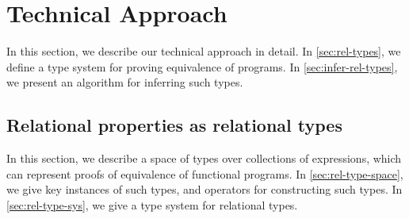 \section{Technical Approach}
%
In this section, we describe our technical approach in detail.
%
In \autoref{sec:rel-types}, we define a type system for proving
equivalence of programs.
%
In \autoref{sec:infer-rel-types}, we present an algorithm for
inferring such types.

\subsection{Relational properties as relational types}
\label{sec:rel-types}
%
In this section, we describe a space of types over collections of
expressions, which can represent proofs of equivalence of functional
programs.
%
In \autoref{sec:rel-type-space}, we give key instances of such types,
and operators for constructing such types.
%
In \autoref{sec:rel-type-sys}, we give a type system for relational
types.

